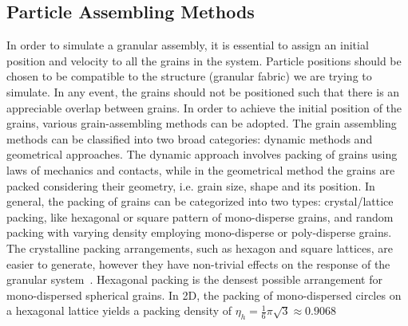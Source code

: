 \subsection{Particle Assembling Methods}
In order to simulate a granular assembly, it is essential to assign an initial 
position and 
velocity to all the grains in the system. Particle positions should be 
chosen to be compatible 
to the structure (granular fabric) we are trying to simulate. In any event, the 
grains should 
not be positioned such that there is an appreciable overlap between grains. 
In order to achieve 
the initial position of the grains, various grain-assembling methods can 
be adopted. The 
grain assembling methods can be classified into two broad categories: 
dynamic methods and 
geometrical approaches. The dynamic approach involves packing of grains using 
laws of mechanics 
and 
contacts, while in the geometrical method the grains are packed considering 
their geometry, 
i.e. 
grain size, shape and its position. In general, the packing of grains can be 
categorized into 
two types: crystal/lattice packing, like hexagonal or square pattern of 
mono-disperse grains, 
and random packing with varying density employing mono-disperse or 
poly-disperse grains. The 
crystalline packing arrangements, such as hexagon and square lattices, are 
easier to generate, 
however they have non-trivial effects on the response of the granular 
system~\citep{Staron2005}. 
Hexagonal packing is the densest possible arrangement for mono-dispersed 
spherical grains. In 2D, 
the packing of mono-dispersed circles on a hexagonal lattice yields a packing 
density of 
$\eta_{\mathit{h}}=\frac{1}{6}\pi\sqrt{3}\approx 0.9068$

